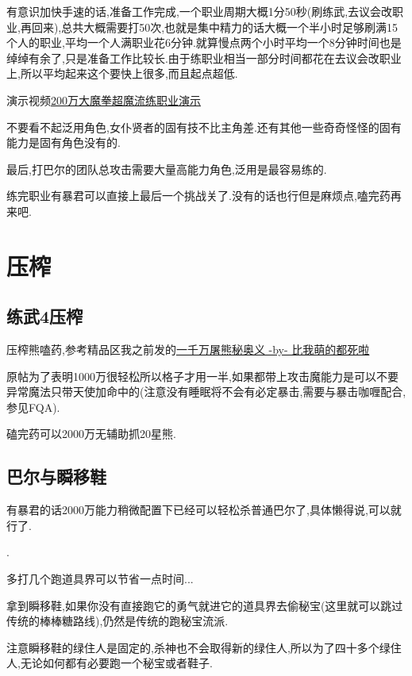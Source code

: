 		有意识加快手速的话,准备工作完成,一个职业周期大概1分50秒(刷练武,去议会改职业,再回来),总共大概需要打50次,也就是集中精力的话大概一个半小时足够刷满15个人的职业,平均一个人满职业花6分钟.就算慢点两个小时平均一个8分钟时间也是绰绰有余了,只是准备工作比较长.由于练职业相当一部分时间都花在去议会改职业上,所以平均起来这个要快上很多,而且起点超低.

		演示视频\href{http://www.bilibili.com/video/av2966618/}{200万大魔拳超魔流练职业演示}

		不要看不起泛用角色,女仆贤者的固有技不比主角差.还有其他一些奇奇怪怪的固有能力是固有角色没有的.

		最后,打巴尔的团队总攻击需要大量高能力角色,泛用是最容易练的.

		练完职业有暴君可以直接上最后一个挑战关了.没有的话也行但是麻烦点,嗑完药再来吧.

	\newpage

	\section{压榨}

		\subsection{练武4压榨}

		压榨熊嗑药,参考精品区我之前发的\href{http://tieba.baidu.com/p/3825275063}{一千万屠熊秘奥义 -by- 比我萌的都死啦}

		原帖为了表明1000万很轻松所以格子才用一半,如果都带上攻击魔能力是可以不要异常魔法只带天使加命中的(注意没有睡眠将不会有必定暴击,需要与暴击咖喱配合,参见FQA).

		磕完药可以2000万无辅助抓20星熊.

		\subsection{巴尔与瞬移鞋}

		有暴君的话2000万能力稍微配置下已经可以轻松杀普通巴尔了,具体懒得说,可以就行了.

		{\color{red}{即便没有这里也建议用2000万能力挑战下,整个游戏挑战关已经没几个了,如果觉得困难可以参考后面修罗篇的巴尔攻略}}.

		多打几个跑道具界可以节省一点时间...

		拿到瞬移鞋,如果你没有直接跑它的勇气就进它的道具界去偷秘宝(这里就可以跳过传统的棒棒糖路线),仍然是传统的跑秘宝流派.

		注意瞬移鞋的绿住人是固定的,杀神也不会取得新的绿住人,所以为了四十多个绿住人,无论如何都有必要跑一个秘宝或者鞋子.

